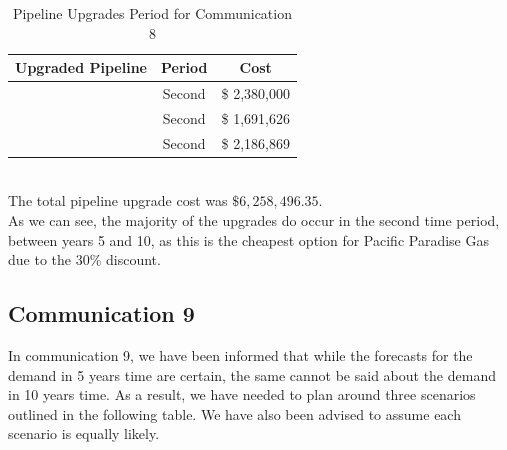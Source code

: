\documentclass{article}
\begin{document}
\renewcommand\baselinestretch{1.5}
\begin{table}[htb]
    \centering
    \color{black}
    \begin{tabular}{|c:c:c|}
        \hline
        \textbf{Upgraded Pipeline} & \textbf{Period} & \textbf{Cost} \\ \hline
         & Second & \$ 2,380,000 \\ \hdashline
         & Second & \$ 1,691,626 \\ \hdashline
         & Second & \$ 2,186,869 \\
        \hline 
    \end{tabular}
    \caption{Pipeline Upgrades Period for Communication 8}
    \label{tab:upgradepipeoptscomm8}
\end{table}
\renewcommand\baselinestretch{1}
\bigskip
\\
\noindent
The total pipeline upgrade cost was \(\$ 6,258,496.35\).\\

\noindent
As we can see, the majority of the upgrades do occur in the second time period, between years 5 and 10, as this is the cheapest option for Pacific Paradise Gas due to the 30\% discount. \\

\newpage
\subsection{Communication 9}
In communication 9, we have been informed that while the forecasts for the demand in 5 years time are certain, the same cannot be said about the demand in 10 years time. As a result, we have needed to plan around three scenarios outlined in the following table. We have also been advised to assume each scenario is equally likely.
\end{document}
